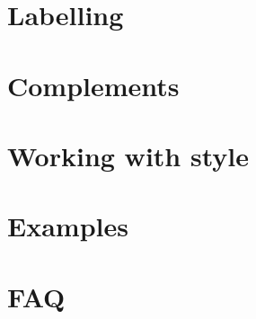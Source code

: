 \documentclass[DIV         = 14,
               fontsize    = 10,
               index       = totoc,
               twoside,
               cadre,
               headings    = small
               ]{tkz-doc}
\begin{document}
\part{Labelling}


\part{Complements}





\part{Working with style}


\part{Examples}



\part{FAQ}


\clearpage\newpage
\small\printindex
\end{document}
